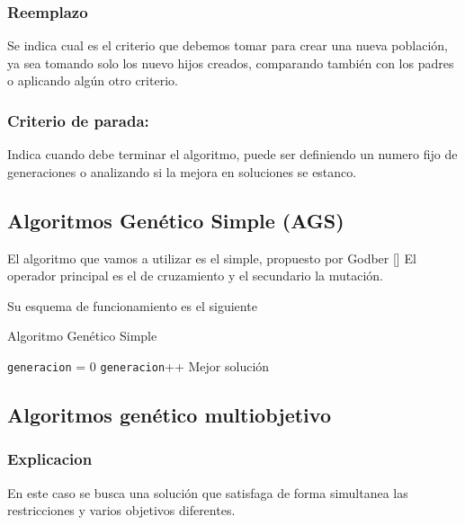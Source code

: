 \subsubsection{Reemplazo} 
Se indica cual es el criterio que debemos tomar para crear una nueva población, ya sea tomando solo los nuevo hijos creados, comparando también con los padres o aplicando algún otro criterio.

\subsubsection{Criterio de parada:} 
Indica cuando debe terminar el algoritmo, puede ser definiendo un numero fijo de generaciones o analizando si la mejora en soluciones se estanco.

\subsection{Algoritmos Genético Simple (AGS)}

El algoritmo que vamos a utilizar es el simple, propuesto por Godber [] 
El operador principal es el de cruzamiento y el secundario la mutación.

Su esquema de funcionamiento es el siguiente


\begin{algorithm}%
	\caption{Algoritmo Genético Simple}
	\label{alg:algoritmo_genetico_simple}
	\begin{algorithmic} [1] 
		{
			\STATE \texttt{generacion} = 0
			\STATE \texttt{generacion}++
			\ENDWHILE
			\RETURN Mejor solución
		}
	\end{algorithmic}
\end{algorithm}




\subsection{Algoritmos genético multiobjetivo}


\subsubsection{Explicacion}
En este caso se busca una solución que satisfaga de forma simultanea las restricciones y varios objetivos diferentes.

